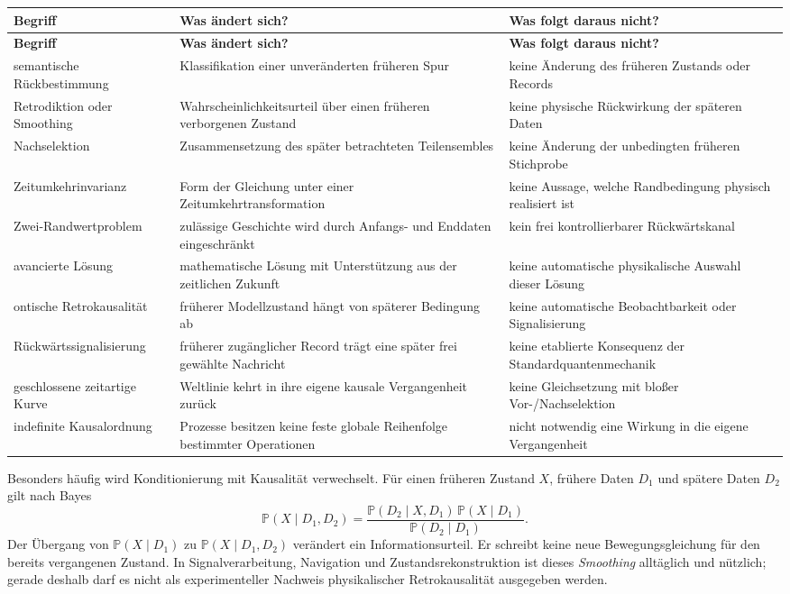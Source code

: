 \documentclass[11pt,a4paper]{article}
\theoremstyle{remark}
\begin{document}
\begin{longtable}{>{\raggedright\arraybackslash}p{}
                  >{\raggedright\arraybackslash}p{}
                  >{\raggedright\arraybackslash}p{}}
\toprule
\textbf{Begriff} & \textbf{Was ändert sich?} & \textbf{Was folgt daraus nicht?} \\
\midrule
\endfirsthead
\toprule
\textbf{Begriff} & \textbf{Was ändert sich?} & \textbf{Was folgt daraus nicht?} \\
\midrule
\endhead
semantische Rückbestimmung & Klassifikation einer unveränderten früheren Spur & keine Änderung des früheren Zustands oder Records \\
Retrodiktion oder Smoothing & Wahrscheinlichkeitsurteil über einen früheren verborgenen Zustand & keine physische Rückwirkung der späteren Daten \\
Nachselektion & Zusammensetzung des später betrachteten Teilensembles & keine Änderung der unbedingten früheren Stichprobe \\
Zeitumkehrinvarianz & Form der Gleichung unter einer Zeitumkehrtransformation & keine Aussage, welche Randbedingung physisch realisiert ist \\
Zwei-Randwertproblem & zulässige Geschichte wird durch Anfangs- und Enddaten eingeschränkt & kein frei kontrollierbarer Rückwärtskanal \\
avancierte Lösung & mathematische Lösung mit Unterstützung aus der zeitlichen Zukunft & keine automatische physikalische Auswahl dieser Lösung \\
ontische Retrokausalität & früherer Modellzustand hängt von späterer Bedingung ab & keine automatische Beobachtbarkeit oder Signalisierung \\
Rückwärts\-signalisierung & früherer zugänglicher Record trägt eine später frei gewählte Nachricht & keine etablierte Konsequenz der Standardquantenmechanik \\
geschlossene zeitartige Kurve & Weltlinie kehrt in ihre eigene kausale Vergangenheit zurück & keine Gleichsetzung mit bloßer Vor-/Nachselektion \\
indefinite Kausalordnung & Prozesse besitzen keine feste globale Reihenfolge bestimmter Operationen & nicht notwendig eine Wirkung in die eigene Vergangenheit \\
\bottomrule
\end{longtable}

Besonders häufig wird Konditionierung mit Kausalität verwechselt. Für einen
früheren Zustand \(X\), frühere Daten \(D_1\) und spätere Daten \(D_2\) gilt
nach Bayes
\begin{equation}
\label{eq:smoothing}
 \mathbb P(X\mid D_1,D_2)
 =\frac{\mathbb P(D_2\mid X,D_1)\,
              \mathbb P(X\mid D_1)}
             {\mathbb P(D_2\mid D_1)}.
\end{equation}
Der Übergang von \(\mathbb P(X\mid D_1)\) zu
\(\mathbb P(X\mid D_1,D_2)\) verändert ein Informationsurteil. Er schreibt
keine neue Bewegungsgleichung für den bereits vergangenen Zustand. In
Signalverarbeitung, Navigation und Zustandsrekonstruktion ist dieses
\emph{Smoothing} alltäglich und nützlich; gerade deshalb darf es nicht als
experimenteller Nachweis physikalischer Retrokausalität ausgegeben werden.
\end{document}
